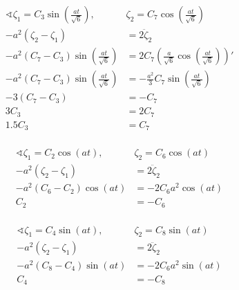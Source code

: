 \begin{align*}
    \sphericalangle \zeta_1 = C_3\sin\left( \frac{at}{\sqrt{6}} \right), & \zeta_2 = C_7 \cos\left( \frac{at}{\sqrt{6}} \right)                            \\
    - a^2(\zeta_2 - \zeta_1)                                             & = 2 \ddot \zeta_2                                                               \\
    - a^2(C_7 - C_3)\sin\left( \frac{at}{\sqrt{6}} \right)               & = 2 C_7\left( \frac{a}{\sqrt{6}}\cos \left( \frac{at}{\sqrt{6}} \right)\right)' \\
    - a^2(C_7 - C_3)\sin\left( \frac{at}{\sqrt{6}} \right)               & = -\frac{a^2}{3}C_7\sin \left( \frac{at}{\sqrt{6}} \right)                      \\
    - 3(C_7 - C_3)                                                       & = -C_7                                                                          \\
    3C_3                                                                 & = 2C_7                                                                          \\
    1.5C_3                                                               & = C_7                                                                           \\
\end{align*}

\begin{align*}
    \sphericalangle \zeta_1 = C_2\cos(at), & \zeta_2 = C_6 \cos(at) \\
    - a^2(\zeta_2 - \zeta_1)               & = 2 \ddot \zeta_2      \\
    - a^2(C_6 - C_2)\cos(at)               & = -2 C_6 a^2 \cos(at)  \\
    C_2                                    & = - C_6                \\
\end{align*}

\begin{align*}
    \sphericalangle \zeta_1 = C_4\sin(at), & \zeta_2 = C_8 \sin(at) \\
    - a^2(\zeta_2 - \zeta_1)               & = 2 \ddot \zeta_2      \\
    - a^2(C_8 - C_4)\sin(at)               & = -2 C_6 a^2 \sin(at)  \\
    C_4                                    & = - C_8                \\
\end{align*}

